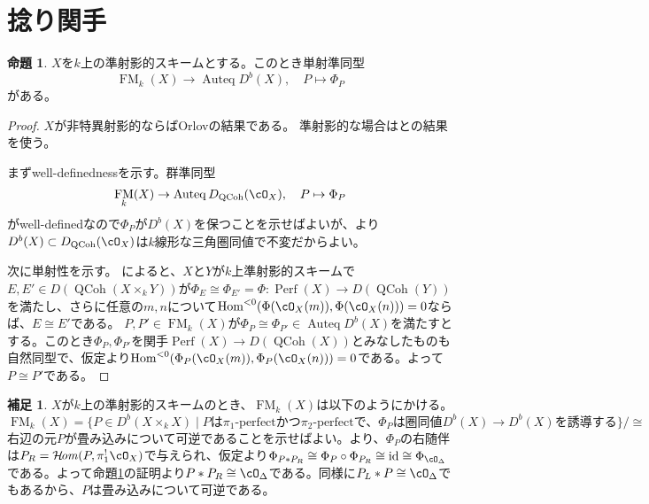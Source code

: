 \documentclass[uplatex, a4paper, dvipdfmx]{jsarticle}
\theoremstyle{definition}
\newtheorem{proposition}[theorem]{命題}
\newtheorem{remark}[theorem]{補足}
\DeclareMathOperator{\Hom}{\mathrm{Hom}}
\DeclareMathOperator{\CHom}{\mathcal{H}\!\mathit{om}}
\DeclareMathOperator{\Auteq}{\mathrm{Auteq}}
\DeclareMathOperator{\id}{\mathrm{id}}
\DeclareMathOperator{\Perf}{\mathrm{Perf}}
\DeclareMathOperator{\QCoh}{\mathrm{QCoh}}
\DeclareMathOperator{\FM}{\mathrm{FM}}
\begin{document}
\section{捻り関手}
\begin{proposition}\label{prop:kernel-to-functor}
    $X$を$k$上の準射影的スキームとする。このとき単射準同型
    \begin{equation}
        \FM_k(X) \to \Auteq D^b(X), \quad P \mapsto \Phi_P
    \end{equation}
    がある。
\end{proposition}
\begin{proof}
    $X$が非特異射影的ならばOrlovの結果である。
    準射影的な場合は\cite{MR2434186}と\cite{MR3556457}の結果を使う。

    まずwell-definednessを示す。群準同型
    \begin{equation}
        \FM_k(X) \to \Auteq D_{\QCoh}(\cO_X), \quad P \mapsto \Phi_P
    \end{equation}
    がwell-definedなので$\Phi_P$が$D^b(X)$を保つことを示せばよいが、\cite[Lemma 6.11, Proposition 6.12]{MR2434186}より$D^b(X) \subset D_{\QCoh}(\cO_X)$は$k$線形な三角圏同値で不変だからよい。

    次に単射性を示す。
    \cite[Remark 1.3, Theorem 1.5]{MR3556457}によると、$X$と$Y$が$k$上準射影的スキームで$E, E' \in D(\QCoh(X \times_k Y))$が$\Phi_E \cong \Phi_{E'} = \Phi \colon \Perf(X) \to D(\QCoh(Y))$を満たし、さらに任意の$m, n$について$\Hom^{<0}(\Phi(\cO_X(m)), \Phi(\cO_X(n))) = 0$ならば、$E \cong E'$である。
    $P, P' \in \FM_k(X)$が$\Phi_P \cong \Phi_{P'} \in \Auteq D^b(X)$を満たすとする。このとき$\Phi_P, \Phi_{P'}$を関手$\Perf(X) \to D(\QCoh(X))$とみなしたものも自然同型で、仮定より$\Hom^{<0}(\Phi_P(\cO_X(m)), \Phi_P(\cO_X(n))) = 0$である。よって$P \cong P'$である。
\end{proof}
\begin{remark}
    $X$が$k$上の準射影的スキームのとき、$\FM_k(X)$は以下のようにかける。
    \begin{equation}
        \FM_k(X) = \{P \in D^b(X \times_k X) \mid P \text{は$\pi_1$-perfectかつ$\pi_2$-perfectで、$\Phi_P$は圏同値$D^b(X) \to D^b(X)$を誘導する}\}/\cong
    \end{equation}
    右辺の元$P$が畳み込みについて可逆であることを示せばよい。\cite{MR3720794}より、$\Phi_P$の右随伴は$P_R = \CHom(P, \pi_1^!\cO_X)$で与えられ、仮定より$\Phi_{P * P_R} \cong \Phi_P \circ \Phi_{P_R} \cong \id \cong \Phi_{\cO_{\Delta}}$である。よって命題\ref{prop:kernel-to-functor}の証明より$P * P_R \cong \cO_{\Delta}$である。同様に$P_L * P \cong \cO_{\Delta}$でもあるから、$P$は畳み込みについて可逆である。
\end{remark}
\end{document}
